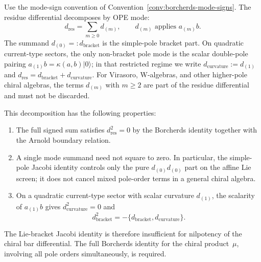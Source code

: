 \begin{proposition}\label{prop:pole-decomposition}
Use the mode-sign convention of
Convention~\ref{conv:borcherds-mode-signs}.
The residue differential decomposes by OPE mode:
\begin{equation}\label{eq:pole-decomposition}
d_{\mathrm{res}}
=
\sum_{m\ge0} d_{(m)},\qquad
d_{(m)}\text{ applies }a_{(m)}b.
\end{equation}
The summand $d_{(0)}=:d_{\mathrm{bracket}}$ is the simple-pole
bracket part. On quadratic current-type sectors, the only
non-bracket pole mode is the scalar double-pole pairing
$a_{(1)}b=\kappa(a,b)|0\rangle$; in that restricted regime we write
$d_{\mathrm{curvature}}:=d_{(1)}$ and
$d_{\mathrm{res}}=d_{\mathrm{bracket}}+d_{\mathrm{curvature}}$.
For Virasoro, W-algebras, and other higher-pole chiral algebras, the
terms $d_{(m)}$ with $m\ge2$ are part of the residue differential and
must not be discarded.

This decomposition has the following properties:
\begin{enumerate}
\item The full signed sum satisfies $d_{\mathrm{res}}^2=0$ by the
Borcherds identity together with the Arnold boundary relation.
\item A single mode summand need not square to zero. In particular,
the simple-pole Jacobi identity controls only the pure
$d_{(0)}d_{(0)}$ part on the affine Lie screen; it does not cancel
mixed pole-order terms in a general chiral algebra.
\item On a quadratic current-type sector with scalar curvature
$d_{(1)}$, the scalarity of $a_{(1)}b$ gives
$d_{\mathrm{curvature}}^2=0$ and
\[
d_{\mathrm{bracket}}^2
=-\{d_{\mathrm{bracket}},d_{\mathrm{curvature}}\}.
\]
\end{enumerate}

The Lie-bracket Jacobi identity is therefore insufficient for
nilpotency of the chiral bar differential. The full Borcherds identity
for the chiral product~$\mu$, involving all pole orders
simultaneously, is required.
\end{proposition}

